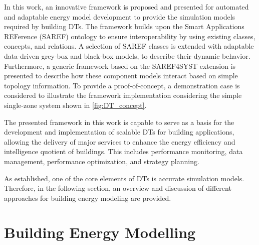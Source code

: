 In this work, an innovative framework is proposed and presented for automated and adaptable energy model development to provide the simulation models required by building DTs. The framework builds upon the Smart Applications REFerence (SAREF) ontology \cite{saref} to ensure interoperability by using existing classes, concepts, and relations. A selection of SAREF classes is extended with adaptable data-driven grey-box and black-box models, to describe their dynamic behavior. Furthermore, a generic framework based on the SAREF4SYST extension is presented to describe how these component models interact based on simple topology information. To provide a proof-of-concept, a demonstration case is considered to illustrate the framework implementation considering the simple single-zone system shown in \autoref{fig:DT_concept}. 


The presented framework in this work is capable to serve as a basis for the development and implementation of scalable DTs for building applications, allowing the delivery of major services to enhance the energy efficiency and intelligence quotient of buildings. This includes performance monitoring, data management, performance optimization, and strategy planning.

As established, one of the core elements of DTs is accurate simulation models. Therefore, in the following section, an overview and discussion of different approaches for building energy modeling are provided. 

\section{Building Energy Modelling}

